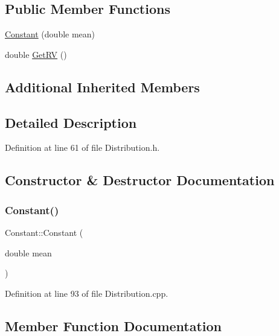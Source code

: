 \subsection*{Public Member Functions}
\begin{DoxyCompactItemize}
\item 
\hyperlink{class_constant_a9b181fdf7e935c56d3b58133ce21efb8}{Constant} (double mean)
\item 
double \hyperlink{class_constant_a9eac5a0bdc360c859f187f8aa94dcd6d}{Get\+RV} ()
\end{DoxyCompactItemize}
\subsection*{Additional Inherited Members}


\subsection{Detailed Description}


Definition at line 61 of file Distribution.\+h.



\subsection{Constructor \& Destructor Documentation}
\mbox{\label{class_constant_a9b181fdf7e935c56d3b58133ce21efb8}} 
\subsubsection{\texorpdfstring{Constant()}{Constant()}}
{\footnotesize\ttfamily Constant\+::\+Constant (\begin{DoxyParamCaption}\item[{double}]{mean }\end{DoxyParamCaption})}



Definition at line 93 of file Distribution.\+cpp.



\subsection{Member Function Documentation}
\mbox{\label{class_constant_a9eac5a0bdc360c859f187f8aa94dcd6d}} 
